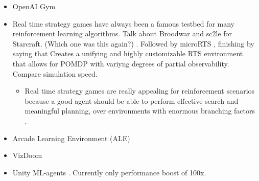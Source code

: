 
\begin{itemize}
\item OpenAI Gym \citep{Brockman2016}
\item Real time strategy games have always been a famous testbed for many reinforcement learning algorithms. Talk about Broodwar \citep{Broodwar} and sc2le \citep{Vinyals2017} for Starcraft. (Which one was this again?) \citep{Synnaeve2016}. Followed by microRTS \citep{Ontanon2013}, finishing by saying that \citep{Andersen2017} Creates a unifying and highly customizable RTS environment that allows for POMDP with variyng degrees of partial observability. Compare simulation speed.
    \begin{itemize}
    \item Real time strategy games are really appealing for reinforcement scenarios because a good agent should be able to perform effective search and meaningful planning, over environments with enormous branching factors \citep{Soemers2014}\citep{Wender2012}. 
    \end{itemize}
\item Arcade Learning Environment (ALE) \citep{Bellemare2015}
\item VizDoom \citep{Kempka2017}
\item Unity ML-agents \citep{UnityMLAgents}. Currently only performance boost of 100x.
\end{itemize}

